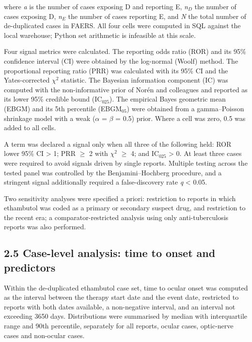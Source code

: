 \documentclass[utf8]{FrontiersinVancouver}
\begin{document}
where \textit{a} is the number of cases exposing D and reporting E, \textit{n}$_{D}$ the number of cases exposing D, \textit{n}$_{E}$ the number of cases reporting E, and \textit{N} the total number of de-duplicated cases in FAERS. All four cells were computed in SQL against the local warehouse; Python set arithmetic is infeasible at this scale.

Four signal metrics were calculated. The reporting odds ratio (ROR) and its 95\% confidence interval (CI) were obtained by the log-normal (Woolf) method. The proportional reporting ratio (PRR) was calculated with its 95\% CI and the Yates-corrected $\chi$$^{2}$ statistic. The Bayesian information component (IC) was computed with the non-informative prior of Norén and colleagues and reported as its lower 95\% credible bound (IC$_{025}$). The empirical Bayes geometric mean (EBGM) and its 5th percentile (EBGM$_{05}$) were obtained from a gamma--Poisson shrinkage model with a weak ($\alpha$ = $\beta$ = 0.5) prior. Where a cell was zero, 0.5 was added to all cells.

A term was declared a signal only when all three of the following held: ROR lower 95\% CI > 1; PRR $\geq$ 2 with $\chi$$^{2}$ $\geq$ 4; and IC$_{025}$ > 0. At least three cases were required to avoid signals driven by single reports. Multiple testing across the tested panel was controlled by the Benjamini--Hochberg procedure, and a stringent signal additionally required a false-discovery rate \textit{q} < 0.05.

Two sensitivity analyses were specified a priori: restriction to reports in which ethambutol was coded as a primary or secondary suspect drug, and restriction to the recent era; a comparator-restricted analysis using only anti-tuberculosis reports was also performed.

\subsection{2.5 Case-level analysis: time to onset and predictors}

Within the de-duplicated ethambutol case set, time to ocular onset was computed as the interval between the therapy start date and the event date, restricted to reports with both dates available, a non-negative interval, and an interval not exceeding 3650 days. Distributions were summarised by median with interquartile range and 90th percentile, separately for all reports, ocular cases, optic-nerve cases and non-ocular cases.
\end{document}
